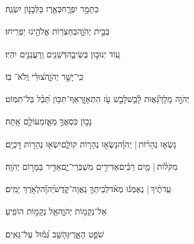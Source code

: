 \documentclass[12pt]{article}
\newcommand{\loc}[1]{\textsuperscript{\locf{#1}}}
\begin{document}
{\loc{ יג}~}‏ כַּתָּמָ֣ר יִפְרָ֑ח{\hfill}כְּאֶ֖רֶז בַּלְּבָנ֣וֹן יִשְׂגֶּֽה׃\par

{\loc{ יד}~}‏ בְּבֵ֣ית יְהֹוָ֑ה{\hfill}בְּחַצְר֖וֹת אֱלֹהֵ֣ינוּ יַפְרִֽיחוּ׃\par

{\loc{ טו}~}‏ע֭וֹד יְנוּב֣וּן בְּשֵׂיבָ֑ה{\hfill}דְּשֵׁנִ֖ים וְֽרַעֲנַנִּ֣ים יִהְיֽוּ׃\par

{\loc{ טז}~}‏ כִּֽי־יָשָׁ֣ר יְהֹוָ֑ה{\hfill}צ֝וּרִ֗י וְֽלֹא־ בּֽוֹ׃\par\pend
\ledpb
\pstart[\subsection*{\textcolor{red}{פרק צג}}]\label{פרק צג}
{\loc{ א}~}‏יְהֹוָ֣ה מָלָךְ֮{\hfill}גֵּא֢וּת לָ֫בֵ֥שׁ\newline\hspace*{.5em}לָבֵ֣שׁ  עֹ֣ז הִתְאַזָּ֑ר{\hfill}אַף־תִּכּ֥וֹן תֵּ֝בֵ֗ל בַּל־תִּמּֽוֹט׃\par

{\loc{ ב}~}‏נָכ֣וֹן כִּסְאֲךָ֣ מֵאָ֑ז{\hfill}מֵעוֹלָ֣ם אָֽתָּה׃\par

{\loc{ ג}~}‏נָשְׂא֤וּ נְהָר֨וֹת | {\hfill}יְֽהֹוָ֗ה\newline\hspace*{.5em}נָשְׂא֣וּ נְהָר֣וֹת קוֹלָ֑ם{\hfill}יִשְׂא֖וּ נְהָר֣וֹת דׇּכְיָֽם׃\par

{\loc{ ד}~}‏מִקֹּל֨וֹת | {\hfill}מַ֤יִם רַבִּ֗ים\newline\hspace*{.5em}אַדִּירִ֣ים מִשְׁבְּרֵי־יָ֑ם{\hfill}אַדִּ֖יר בַּמָּר֣וֹם יְהֹוָֽה׃\par

{\loc{ ה}~}‏עֵֽדֹתֶ֨יךָ |  נֶאֶמְנ֬וּ מְאֹ֗ד{\hfill}לְבֵיתְךָ֥ נַאֲוָה־קֹ֑דֶשׁ\newline\hspace*{.5em}יְ֝הֹוָ֗ה{\hfill}לְאֹ֣רֶךְ יָמִֽים׃\par\pend
\ledpb
\pstart[\subsection*{\textcolor{red}{פרק צד}}]\label{פרק צד}
{\loc{ א}~}‏אֵל־נְקָמ֥וֹת יְהֹוָ֑ה{\hfill}אֵ֖ל נְקָמ֣וֹת הוֹפִֽיעַ׃\par

{\loc{ ב}~}‏ שֹׁפֵ֣ט הָאָ֑רֶץ{\hfill}הָשֵׁ֥ב גְּ֝מ֗וּל עַל־גֵּאִֽים׃\par
\end{document}
